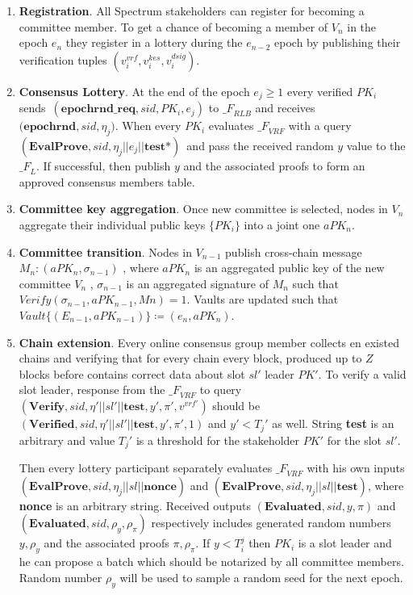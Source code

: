 \begin{enumerate}
    \item \textbf{Registration}.
    All Spectrum stakeholders can register for becoming a committee member.
    To get a chance of becoming a member of $V_n$ in the epoch $e_n$ they register in a lottery during the $e_{n-2}$
    epoch by publishing their verification tuples ${(v_i^{vrf}, v_i^{kes}, v_i^{dsig})}$.
    \item \textbf{Consensus Lottery}.
    At the end of the epoch ${e_j \geqslant 1}$ every verified $PK_i$ sends\
    ${(\textbf{epochrnd\_req}, sid, PK_i, e_j)}$ to ${\mathcal_{F}}_{RLB}$ and receives\
    $({\textbf{epochrnd}, sid, \eta_j)}$.
    When every $PK_i$ evaluates ${\mathcal_{F}}_{VRF}$ with a query\
    ${(\textbf{EvalProve}, sid, \eta_j || e_j || \textbf{test*})}$\
    and pass the received random $y$ value to the ${\mathcal_{F}}_{L}$.
    If successful, then publish $y$ and the associated proofs to form an approved consensus members table.

    \item \textbf{Committee key aggregation}.
    Once new committee is selected, nodes in $V_n$ aggregate their individual public keys $\{PK_i\}$ into
    a joint one $aPK_n$.
    \item \textbf{Committee transition}.
    Nodes in $V_{n-1}$ publish cross-chain message ${M_n : (aPK_n, \sigma_{n-1})}$ , where $aPK_n$ is
    an aggregated public key of the new committee $V_n$ , $\sigma_{n-1}$ is an aggregated signature of
    $M_n$ such that ${Verify(\sigma_{n-1}, aPK_{n-1}, Mn) = 1}$.
    Vaults are updated such that ${Vault\{(E_{n-1}, aPK_{n-1})\} \coloneqq (e_n, aPK_n)}$.
    \item \textbf{Chain extension}.
    Every online consensus group member collects en existed chains and verifying that for every chain every block, produced up to $Z$ blocks before contains correct data about slot $sl'$ leader $PK'$.
    To verify a valid slot leader, response from the ${\mathcal_{F}}_{VRF}$ to query ${(\textbf{Verify}, sid, \eta' || sl' || \textbf{test}, y', \pi', v^{vrf'})}$ should be ${(\textbf{Verified}, sid, \eta' || sl' || \textbf{test}, y', \pi', 1)}$ and $y'<T_j'$ as well.
    String \textbf{test} is an arbitrary and value $T_j'$ is a threshold for the stakeholder $PK'$ for the slot $sl'$.

    Then every lottery participant separately evaluates ${\mathcal_{F}}_{VRF}$ with his own inputs ${(\textbf{EvalProve}, sid, \eta_j || sl || \textbf{nonce})}$ and ${(\textbf{EvalProve}, sid, \eta_j || sl || \textbf{test})}$, where \textbf{nonce} is an arbitrary string.
    Received outputs ${(\textbf{Evaluated}, sid, y, \pi)}$ and ${(\textbf{Evaluated}, sid, \rho_y, \rho_\pi)}$ respectively includes generated random numbers ${y, \rho_y}$ and the associated proofs ${\pi, \rho_\pi}$.
    If ${y < T_i^j}$ then $PK_i$ is a slot leader and he can propose a batch which should be notarized by all committee members.
    Random number $\rho_y$ will be used to sample a random seed for the next epoch.


\end{enumerate}
